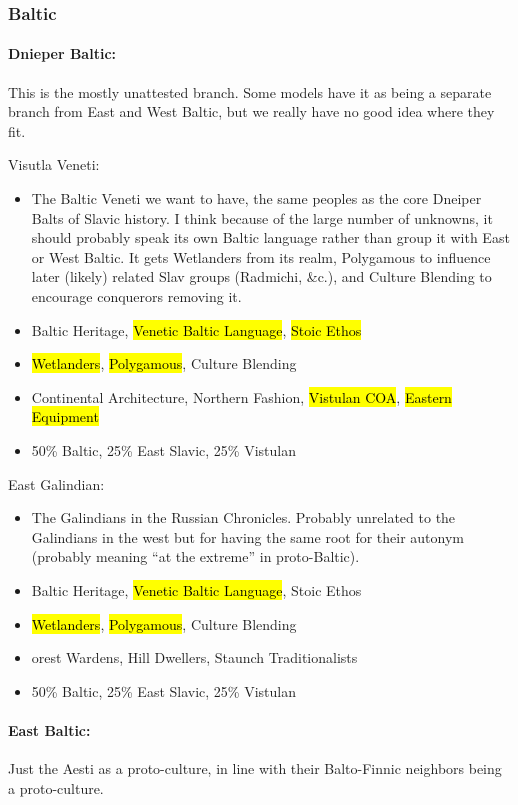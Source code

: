 \documentclass{article}
\begin{document}
	\subsubsection{Baltic}
	
	\paragraph{Dnieper Baltic:}
	This is the mostly unattested branch.
	Some models have it as being a separate branch from East and West Baltic, but we really have no good idea where they fit.
	
	Visutla Veneti:
	\begin{itemize}
		\item The Baltic Veneti we want to have, the same peoples as the core Dneiper Balts of Slavic history. I think because of the large number of unknowns, it should probably speak its own Baltic language rather than group it with East or West Baltic. It gets Wetlanders from its realm, Polygamous to influence later (likely) related Slav groups (Radmichi, \&c.), and Culture Blending to encourage conquerors removing it.
		\item Baltic Heritage, \hl{Venetic Baltic Language}, \hl{Stoic Ethos}
		\item \hl{Wetlanders}, \hl{Polygamous}, Culture Blending
		\item Continental Architecture, Northern Fashion, \hl{Vistulan COA}, \hl{Eastern Equipment}
		\item 50\% Baltic, 25\% East Slavic, 25\% Vistulan
	\end{itemize}
	
	East Galindian:
	\begin{itemize}
		\item The Galindians in the Russian Chronicles. Probably unrelated to the Galindians in the west but for having the same root for their autonym (probably meaning “at the extreme” in proto-Baltic).
		\item Baltic Heritage, \hl{Venetic Baltic Language}, Stoic Ethos
		\item \hl{Wetlanders}, \hl{Polygamous}, Culture Blending
		\item orest Wardens, Hill Dwellers, Staunch Traditionalists
		\item 50\% Baltic, 25\% East Slavic, 25\% Vistulan
	\end{itemize}
	
	\paragraph{East Baltic:}
	Just the Aesti as a proto-culture, in line with their Balto-Finnic neighbors being a proto-culture.
	
\end{document}
